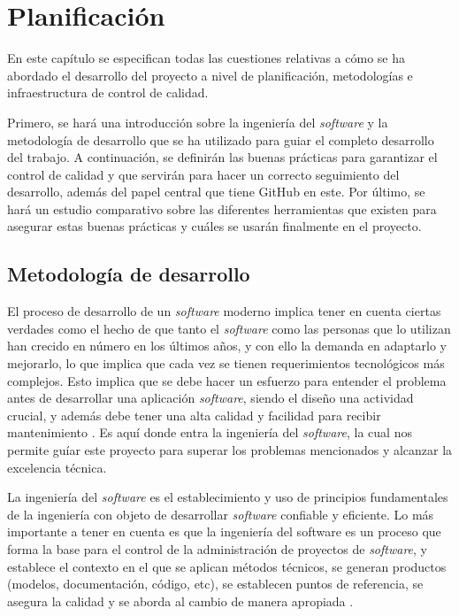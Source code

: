 \chapter{Planificación}
En este capítulo se especifican todas las cuestiones relativas a cómo se ha abordado el desarrollo del proyecto a nivel de planificación, metodologías e infraestructura de control de calidad. 

Primero, se hará una introducción sobre la ingeniería del \textit{software} y la metodología de desarrollo que se ha utilizado para guiar el completo desarrollo del trabajo. A continuación, se definirán las buenas prácticas para garantizar el control de calidad y que servirán para hacer un correcto seguimiento del desarrollo, además del papel central que tiene GitHub en este. Por último, se hará un estudio comparativo sobre las diferentes herramientas que existen para asegurar estas buenas prácticas y cuáles se usarán finalmente en el proyecto.

\section{Metodología de desarrollo}
El proceso de desarrollo de un \textit{software} moderno implica tener en cuenta ciertas verdades como el hecho de que tanto el \textit{software} como las personas que lo utilizan han crecido en número en los últimos años, y con ello la demanda en adaptarlo y mejorarlo, lo que implica que cada vez se tienen requerimientos tecnológicos más complejos. Esto implica que se debe hacer un esfuerzo para entender el problema antes de desarrollar una aplicación \textit{software}, siendo el diseño una actividad crucial, y además debe tener una alta calidad y facilidad para recibir mantenimiento \cite{pressman_software_2015}. Es aquí donde entra la ingeniería del \textit{software}, la cual nos permite guíar este proyecto para superar los problemas mencionados y alcanzar la excelencia técnica.

La ingeniería del \textit{software} es el establecimiento y uso de principios fundamentales de la ingeniería con objeto de desarrollar \textit{software} confiable y eficiente. Lo más importante a tener en cuenta es que la ingeniería del software es un proceso que forma la base para el control de la administración de proyectos de \textit{software}, y establece el contexto en el que se aplican métodos técnicos, se generan productos (modelos, documentación, código, etc), se establecen puntos de referencia, se asegura la calidad y se aborda al cambio de manera apropiada \cite{pressman_software_2015}.

